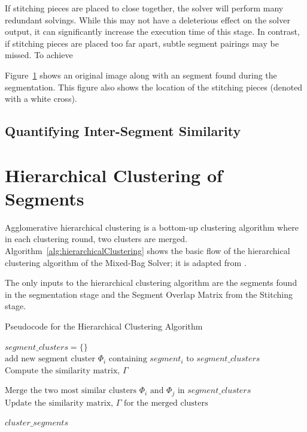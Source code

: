 If stitching pieces are placed to close together, the solver will perform many redundant solvings.  While this may not have a deleterious effect on the solver output, it can significantly increase the execution time of this stage.  In contrast, if stitching pieces are placed too far apart, subtle segment pairings may be missed.  To achieve 

Figure~\ref{} shows an original image along with an segment found during the segmentation.  This figure also shows the location of the stitching pieces (denoted with a white cross).  

\subsection{Quantifying Inter-Segment Similarity}



\section{Hierarchical Clustering of Segments}

Agglomerative hierarchical clustering is a bottom-up clustering algorithm where in each clustering round, two clusters are merged.  Algorithm~\ref{alg:hierarchicalClustering} shows the basic flow of the hierarchical clustering algorithm of the Mixed-Bag Solver; it is adapted from \cite{tanIntroToDataMining}.  

The only inputs to the hierarchical clustering algorithm are the segments found in the segmentation stage and the Segment Overlap Matrix from the Stitching stage.

\begin{algorithm}
\caption{Pseudocode for the Hierarchical Clustering Algorithm}\label{alg:hierarchicalClustering}
\begin{algorithmic}[1]
	\State $\textit{segment\_clusters} = \{ \}$	
		\State $\text{add new segment cluster } \Phi_i \text{ containing } segment_i \text{ to } \textit{segment\_clusters}$
	\EndFor
    \State $\text{Compute the similarity matrix, } \Gamma$
\item[]
    	\State $\text{Merge the two most similar clusters } \Phi_i \text{ and } \Phi_j \text{ in } \textit{segment\_clusters}$
    	\State $\text{Update the similarity matrix, } \Gamma \text{ for the merged clusters}$
	\EndWhile
\item[]
    \State \Return $\textit{cluster\_segments}$
\EndFunction
\end{algorithmic}
\end{algorithm}

